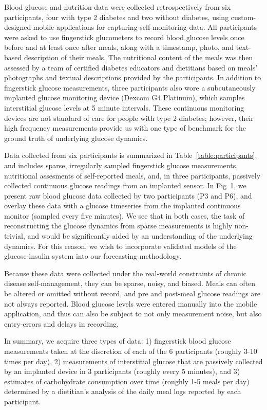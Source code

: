 \documentclass[10pt,letterpaper]{article}
\begin{document}
Blood glucose and nutrition data were collected retrospectively from six participants, four with type 2 diabetes and two without diabetes, using custom-designed mobile applications for capturing self-monitoring data. All participants were asked to use fingerstick glucometers to record blood glucose levels once before and at least once after meals, along with a timestamp, photo, and text-based description of their meals. The nutritional content of the meals was then assessed by a team of certified diabetes educators and dietitians based on meals' photographs and textual descriptions provided by the participants. In addition to fingerstick glucose measurements, three participants also wore a subcutaneously implanted glucose monitoring device (Dexcom G4 Platinum), which samples interstitial glucose levels at 5 minute intervals. These continuous monitoring devices are not standard of care for people with type 2 diabetes; however, their high frequency measurements provide us with one type of benchmark for the ground truth of underlying glucose dynamics.

Data collected from six participants is summarized in Table~\ref{table:participants}, and includes sparse, irregularly sampled fingerstick glucose measurements, nutritional assesments of self-reported meals, and, in three participants, passively collected continuous glucose readings from an implanted sensor.
In Fig~1, we present raw blood glucose data collected by two participants (P3 and P6), and overlay these data with a glucose timeseries from the implanted continuous monitor (sampled every five minutes). We see that in both cases, the task of reconstructing the glucose dynamics from sparse measurements is highly non-trivial, and would be significantly aided by an understanding of the underlying dynamics. For this reason, we wish to incorporate validated models of the glucose-insulin system into our forecasting methodology.

Because these data were collected under the real-world constraints of chronic disease self-management, they can be sparse, noisy, and biased.  Meals can often be altered or omitted without record, and pre and post-meal glucose readings are not always reported. Blood glucose levels were entered manually into the mobile application, and thus can also be subject to not only measurement noise, but also entry-errors and delays in recording.

In summary, we acquire three types of data: 1) fingerstick blood glucose measurements taken at the discretion of each of the 6 participants (roughly 3-10 times per day), 2) measurements of interstitial glucose that are passively collected by an implanted device in 3 participants (roughly every 5 minutes), and 3) estimates of carbohydrate consumption over time (roughly 1-5 meals per day) determined by a dietitian's analysis of the daily meal logs reported by each participant.
\end{document}
